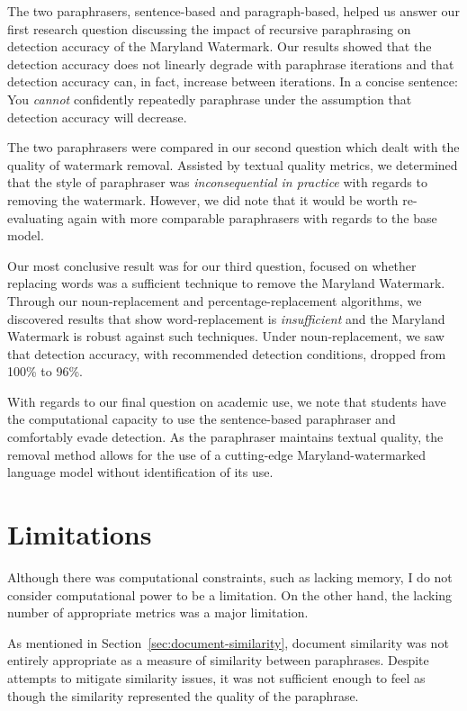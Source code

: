 \documentclass{l4proj}
\theoremstyle{definition}
\begin{document}
    The two paraphrasers, sentence-based and paragraph-based, helped us answer our first research question discussing the impact of recursive paraphrasing on detection accuracy of the Maryland Watermark. Our results showed that the detection accuracy does not linearly degrade with paraphrase iterations and that detection accuracy can, in fact, increase between iterations. In a concise sentence: You \emph{cannot} confidently repeatedly paraphrase under the assumption that detection accuracy will decrease.
    
    The two paraphrasers were compared in our second question which dealt with the quality of watermark removal. Assisted by textual quality metrics, we determined that the style of paraphraser was \emph{inconsequential in practice} with regards to removing the watermark. However, we did note that it would be worth re-evaluating again with more comparable paraphrasers with regards to the base model.
    
    Our most conclusive result was for our third question, focused on whether replacing words was a sufficient technique to remove the Maryland Watermark. Through our noun-replacement and percentage-replacement algorithms, we discovered results that show word-replacement is \emph{insufficient} and the Maryland Watermark is robust against such techniques. Under noun-replacement, we saw that detection accuracy, with recommended detection conditions, dropped from 100\% to 96\%. 

    With regards to our final question on academic use, we note that students have the computational capacity to use the sentence-based paraphraser and comfortably evade detection. As the paraphraser maintains textual quality, the removal method allows for the use of a cutting-edge Maryland-watermarked language model without identification of its use. 

\section{Limitations}
    Although there was computational constraints, such as lacking memory, I do not consider computational power to be a limitation. On the other hand, the lacking number of appropriate metrics was a major limitation.

    As mentioned in Section~\ref{sec:document-similarity}, document similarity was not entirely appropriate as a measure of similarity between paraphrases. Despite attempts to mitigate similarity issues, it was not sufficient enough to feel as though the similarity represented the quality of the paraphrase.
\end{document}
